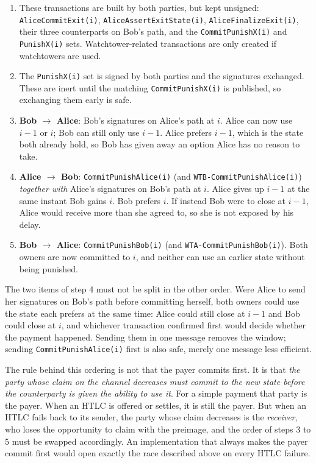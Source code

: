 \documentclass[11pt,a4paper]{article}
\newcommand{\txname}[1]{\texttt{#1}}
\begin{document}
\begin{enumerate}
    \item These transactions are built by both parties, but kept unsigned: \txname{AliceCommitExit(i)}, \txname{AliceAssertExitState(i)}, \txname{AliceFinalizeExit(i)}, their three counterparts on Bob's path, and the \txname{CommitPunishX(i)} and \txname{PunishX(i)} sets. Watchtower-related transactions are only created if watchtowers are used.

    \item The \txname{PunishX(i)} set is signed by both parties and the signatures exchanged. These are inert until the matching \txname{CommitPunishX(i)} is published, so exchanging them early is safe.

    \item \textbf{Bob $\rightarrow$ Alice}: Bob's signatures on Alice's path at $i$. Alice can now use $i-1$ or $i$; Bob can still only use $i-1$. Alice prefers $i-1$, which is the state both already hold, so Bob has given away an option Alice has no reason to take.

    \item \textbf{Alice $\rightarrow$ Bob}: \txname{CommitPunishAlice(i)} (and \txname{WTB-CommitPunishAlice(i)}) \emph{together with} Alice's signatures on Bob's path at $i$. Alice gives up $i-1$ at the same instant Bob gains $i$. Bob prefers $i$. If instead Bob were to close at $i-1$, Alice would receive more than she agreed to, so she is not exposed by his delay.

    \item \textbf{Bob $\rightarrow$ Alice}: \txname{CommitPunishBob(i)} (and \txname{WTA-CommitPunishBob(i)}). Both owners are now committed to $i$, and neither can use an earlier state without being punished.
\end{enumerate}

The two items of step 4 must not be split in the other order. Were Alice to send her signatures on Bob's path before committing herself, both owners could use the state each prefers at the same time: Alice could still close at $i-1$ and Bob could close at $i$, and whichever transaction confirmed first would decide whether the payment happened. Sending them in one message removes the window; sending \txname{CommitPunishAlice(i)} first is also safe, merely one message less efficient.

The rule behind this ordering is not that the payer commits first. It is that \emph{the party whose claim on the channel decreases must commit to the new state before the counterparty is given the ability to use it}. For a simple payment that party is the payer. When an HTLC is offered or settles, it is still the payer. But when an HTLC fails back to its sender, the party whose claim decreases is the \emph{receiver}, who loses the opportunity to claim with the preimage, and the order of steps 3 to 5 must be swapped accordingly. An implementation that always makes the payer commit first would open exactly the race described above on every HTLC failure.
\end{document}
